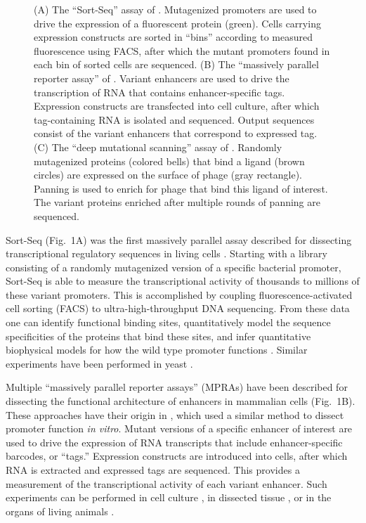 \documentclass{bmcart}
\begin{document}
%
%
\begin{figure}[h!]
\caption{
(A) The ``Sort-Seq'' assay of \cite{Kinney:2010tn}. Mutagenized promoters are used to drive the expression of a fluorescent protein (green). Cells carrying expression constructs are sorted in ``bins'' according to measured fluorescence using FACS, after which the mutant promoters found in each bin of sorted cells are sequenced. (B) The ``massively parallel reporter assay'' of \cite{Melnikov:2012dw}. Variant enhancers are used to drive the transcription of RNA that contains enhancer-specific tags. Expression constructs are transfected into cell culture, after which tag-containing RNA is isolated and sequenced. Output sequences consist of the variant enhancers that correspond to expressed tag. (C) The ``deep mutational scanning'' assay of \cite{Fowler:2010gt}. Randomly mutagenized proteins (colored bells) that bind a ligand (brown circles) are expressed on the surface of phage (gray rectangle). Panning is used to enrich for phage that bind this ligand of interest. The variant proteins enriched after multiple rounds of panning are sequenced. 
}
\label{fig:experiments}
\end{figure}

Sort-Seq (Fig.\ 1A) was the first massively parallel assay described for dissecting transcriptional regulatory sequences in living cells \cite{Kinney:2010tn}. Starting with a library consisting of a randomly mutagenized version of a specific bacterial promoter, Sort-Seq is able to measure the transcriptional activity of thousands to millions of these variant promoters. This is accomplished by coupling fluorescence-activated cell sorting (FACS) to ultra-high-throughput DNA sequencing. From these data one can identify functional binding sites, quantitatively model the sequence specificities of the proteins that bind these sites, and infer quantitative biophysical models for how the wild type promoter functions \cite{Kinney:2010tn}. Similar experiments have been performed in yeast \cite{Sharon:2012io}.

Multiple ``massively parallel reporter assays'' (MPRAs) \cite{Melnikov:2012dw,Patwardhan:2012hy,Kwasnieski:2012hu} have been described for dissecting the functional architecture of enhancers in mammalian cells (Fig.\ 1B). These approaches have their origin in \cite{Patwardhan:2009cw}, which used a similar method to dissect promoter function \textit{in vitro}. Mutant versions of a specific enhancer of interest are used to drive the expression of RNA transcripts that include enhancer-specific barcodes, or ``tags.'' Expression constructs are introduced into cells, after which RNA is extracted and expressed tags are sequenced. This provides a measurement of the transcriptional activity of each variant enhancer. Such experiments can be performed in cell culture \cite{Melnikov:2012dw}, in dissected tissue \cite{Kwasnieski:2012hu}, or in the organs of living animals \cite{Patwardhan:2012hy}.
\end{document}
